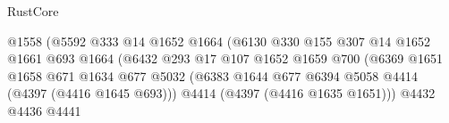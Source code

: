 \begin{lexlean}{RustCore}
\begin{coremodule}
                                                    @1558
                                                    (@5592
                                                      @333
                                                      @14
                                                      @1652
                                                      @1664
                                                      (@6130
                                                        @330
                                                        @155
                                                        @307
                                                        @14
                                                        @1652
                                                        @1661
                                                        @693
                                                        @1664
                                                        (@6432
                                                          @293
                                                          @17
                                                          @107
                                                          @1652
                                                          @1659
                                                          @700
                                                          (@6369
                                                            @1651
                                                            @1658
                                                            @671
                                                            @1634
                                                            @677
                                                            @5032
                                                            (@6383
                                                              @1644
                                                              @677
                                                              @6394
                                                              @5058
                                                              @4414
                                                              (@4397 (@4416 @1645 @693)))
                                                            @4414
                                                            (@4397 (@4416 @1635 @1651)))
                                                          @4432
                                                          @4436
                                                          @4441

\end{coremodule}
\end{lexlean}
